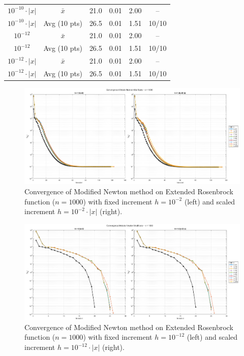 \documentclass[a4paper,12pt]{article}
\begin{document}
\begin{table}[htbp]
{\begin{tabular}{|c|c|c|c|c|c|}
				$10^{-10}\cdot|x|$   & $\bar{x}$       & 21.0  & 0.01 & 2.00 & --     \\
				$10^{-10}\cdot|x|$   & Avg (10 pts)    & 26.5  & 0.01 & 1.51 & 10/10 \\
				\hline
				$10^{-12}$           & $\bar{x}$       & 21.0  & 0.01 & 2.00 & --     \\
				$10^{-12}$           & Avg (10 pts)    & 26.5  & 0.01 & 1.51 & 10/10 \\
				$10^{-12}\cdot|x|$   & $\bar{x}$       & 21.0  & 0.01 & 2.00 & --     \\
				$10^{-12}\cdot|x|$   & Avg (10 pts)    & 26.5  & 0.01 & 1.51 & 10/10 \\
				\hline
			\end{tabular}%
		}
		\label{tab:fd_results_1k}
	\end{table}
	\newpage
	\begin{figure}[htbp]
		\centering
		\includegraphics[width=\textwidth]{../immagini/ext_1k_h2.png}
		\caption{Convergence of Modified Newton method on Extended Rosenbrock function ($n=1000$) with fixed increment $h = 10^{-2}$ (left) and scaled increment $h = 10^{-2}\cdot|x|$ (right).}
		\label{fig:fd_1k_h2}
	\end{figure}
	
	\begin{figure}[htbp]
		\centering
		\includegraphics[width=\textwidth]{../immagini/ext_1k_h12.png}
		\caption{Convergence of Modified Newton method on Extended Rosenbrock function ($n=1000$) with fixed increment $h = 10^{-12}$ (left) and scaled increment $h = 10^{-12}\cdot|x|$ (right).}
		\label{fig:fd_1k_h12}
	\end{figure}
	
\end{document}
